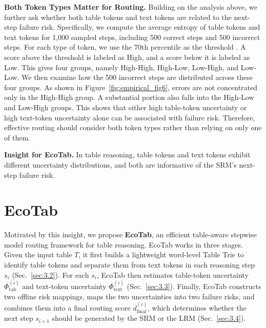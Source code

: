 \documentclass[11pt]{article}
\begin{document}
\textbf{Both Token Types Matter for Routing.} 
Building on the analysis above, we further ask whether both table tokens and text tokens are related to the next-step failure risk. Specifically, we compute the average entropy of table tokens and text tokens for 1,000 sampled steps, including 500 correct steps and 500 incorrect steps. For each type of token, we use the 70th percentile as the threshold \citep{notin2021improving}. A score above the threshold is labeled as High, and a score below it is labeled as Low. This gives four groups, namely High-High, High-Low, Low-High, and Low-Low. We then examine how the 500 incorrect steps are distributed across these four groups. As shown in Figure~\ref{fig:empirical_fig6}, errors are not concentrated only in the High-High group. A substantial portion also falls into the High-Low and Low-High groups. This shows that either high table-token uncertainty or high text-token uncertainty alone can be associated with failure risk. Therefore, effective routing should consider both token types rather than relying on only one of them.

\vspace{-5pt}
\begin{tcolorbox}[
    colback=blue!6!white,      %
    colframe=black,            %
    coltitle=white,            %
    fonttitle=\bfseries,       %
    boxrule=.7pt,
    width=\linewidth,
    top=1mm,
    bottom=1mm,
    left=2mm,                  %
    right=2mm,                 %
]
\vspace{-4pt}
\textbf{Insight for EcoTab.} In table reasoning, table tokens and text tokens exhibit different uncertainty distributions, and both are informative of the SRM's next-step failure risk.
\vspace{-4pt}
\end{tcolorbox}
\vspace{-9pt}




\section{EcoTab}
\vspace{-5pt}
Motivated by this insight, we propose \textbf{EcoTab}, an efficient table-aware stepwise model routing framework for table reasoning. EcoTab works in three stages. Given the input table $T$, it first builds a lightweight word-level Table Trie to identify table tokens and separate them from text tokens in each reasoning step $s_i$ (Sec.~\ref{sec:3.2}). For each $s_i$, EcoTab then estimates table-token uncertainty $\Phi_{\text{tab}}^{(i)}$ and text-token uncertainty $\Phi_{\text{text}}^{(i)}$ (Sec.~\ref{sec:3.3}). Finally, EcoTab constructs two offline risk mappings, maps the two uncertainties into two failure risks, and combines them into a final routing score $d_{\text{final}}^{(i)}$, which determines whether the next step $s_{i+1}$ should be generated by the SRM or the LRM (Sec.~\ref{sec:3.4}).
\vspace{-5pt}
\end{document}
